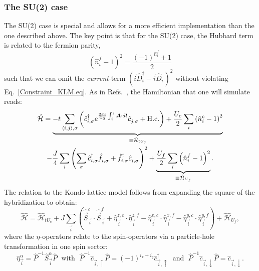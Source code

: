 \subsubsection*{The SU(2) case} 
The SU(2) case is special and allows for a more efficient implementation than the one described above.  The  key point is that  for the SU(2) case, the  Hubbard term is  related to  the fermion parity,
\begin{equation} 
   \left(   \hat{n}^f_i - 1 \right)^2    = \frac{  (-1)^{\hat{n}^f_i}  +1 }{2}
\end{equation}
such that we can omit the \textit{current}-term  $ \left(  i\hat{D}^{\dagger}_{i}  - i  \hat{D}^{\phantom\dagger}_{i}    \right)^2 $    without violating  Eq.~\eqref{Constraint_KLM.eq}.  
As in Refs.~\cite{Assaad99a,Capponi00,Beach04}, the Hamiltonian that one will simulate reads: 
 \begin{multline}
 \label{eqn:ham_kondo}
 	\hat{\mathcal{H}}  =
	\underbrace{-t \sum_{\langle i,j \rangle,\sigma} \left( \hat{c}_{i,\sigma}^{\dagger} e^{\frac{2\pi i}{\Phi_0}  \int_{i}^{j} \ve{A}\cdot d \ve{l}} \hat{c}_{j,\sigma}^{\phantom\dagger}   + \hc \right) +
	  \frac{U_c}{2}   \sum_{i}   \left( \hat{n}^{c}_{i} -1 \right)^2    }_{\equiv \hat{\mathcal{H}}_{tU_c}}  \\
  - \frac{J}{4} 	\sum_{i} \left( \sum_{\sigma} \hat{c}_{i,\sigma}^{\dagger}  \hat{f}_{i,\sigma}^{\phantom\dagger}  + 
	                                                        \hat{f}_{i,\sigma}^{\dagger}  \hat{c}_{i,\sigma}^{\phantom\dagger}   \right)^{2}   +
        \underbrace{\frac{U_f}{2}   \sum_{i}   \left( \hat{n}^{f}_{i} -1 \right)^2}_{\equiv \hat{\mathcal{H}}_{U_f}}.
 \end{multline}
The  relation to the Kondo lattice model follows  from expanding the square  of the hybridization to obtain: 
 \begin{equation}
 	\hat{\mathcal{H}}  =\hat{\mathcal{H}}_{tU_c}   
	+ J \sum_{\vec{i}}  \left(  \hat{\vec{S}}^{c}_{\vec{i}} \cdot  \hat{\vec{S}}^{f}_{\vec{i}}    +   \hat{\eta}^{z,c}_{\vec{i}} \cdot  \hat{\eta}^{z,f}_{\vec{i}}  
		-  \hat{\eta}^{x,c}_{\vec{i}} \cdot  \hat{\eta}^{x,f}_{\vec{i}}  -  \hat{\eta}^{y,c}_{\vec{i}} \cdot  \hat{\eta}^{y,f}_{\vec{i}} \right) 
	 + \hat{\mathcal{H}}_{U_f},
 \end{equation}
 where the $\eta$-operators  relate to the spin-operators via a particle-hole transformation in one spin sector: 
 \begin{equation} 
 	\hat{\eta}^{\alpha}_{\vec{i}}  = \hat{P}^{-1}  \hat{S}^{\alpha}_{\vec{i}} \hat{P}  	\; \text{ with }  \;   
	\hat{P}^{-1}  \hat{c}^{\phantom\dagger}_{\vec{i},\uparrow} \hat{P}  =   (-1)^{i_x+i_y} \hat{c}^{\dagger}_{\vec{i},\uparrow}  \; \text{ and }  \;   
	\hat{P}^{-1}  \hat{c}^{\phantom\dagger}_{\vec{i},\downarrow} \hat{P}  = \hat{c}^{\phantom\dagger}_{\vec{i},\downarrow} .
 \end{equation}
